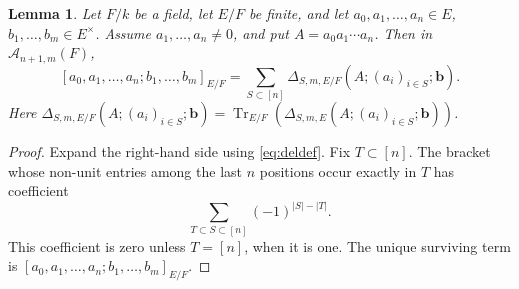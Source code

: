 \documentclass[a4paper,12pt,reqno]{amsart}
\numberwithin{equation}{section}
\newtheorem{lem}[lem]{Lemma}
\theoremstyle{definition}
\DeclareMathOperator{\Tr}{Tr}
\newcommand{\Id}{\mathrm{id}}
\newcommand{\Acal}{\mathcal{A}}
\newcommand{\Dcal}{\mathcal{D}}
\newcommand{\vb}{\mathbf{b}}
\begin{document}

\begin{lem}\label{lem:expand}
Let $F/k$ be a field, let $E/F$ be finite, and let
$a_0,a_1,\ldots,a_n\in E$, $b_1,\dots,b_m\in E^\times$.  Assume $a_1,\ldots,a_n\neq0$, and put
$A=a_0a_1\cdots a_n$.  Then in $\Acal_{n+1,m}(F)$,
\begin{equation}\label{eq:expand}
 [a_0,a_1,\ldots,a_n;b_1,\dots,b_m]_{E/F}
 =
 \sum_{S\subset [n]}
 \Delta_{S,m,E/F}(A;(a_i)_{i\in S};\vb).
\end{equation}
Here $\Delta_{S,m,E/F}(A;(a_i)_{i\in S};\vb)=\Tr_{E/F}(\Delta_{S,m,E}(A;(a_i)_{i\in S};\vb))$.
\end{lem}

\begin{proof}
Expand the right-hand side using \eqref{eq:deldef}.  Fix
$T\subset [n]$.  The bracket whose non-unit entries among the last $n$
positions occur exactly in $T$ has coefficient
\begin{equation}\label{eq:altsum2}
 \sum_{T\subset S\subset [n]}(-1)^{|S|-|T|}.
\end{equation}
This coefficient is zero unless $T=[n]$, when it is one.  The unique
surviving term is $[a_0,a_1,\ldots,a_n;b_1,\dots,b_m]_{E/F}$.
\end{proof}

\bigskip
\end{document}

